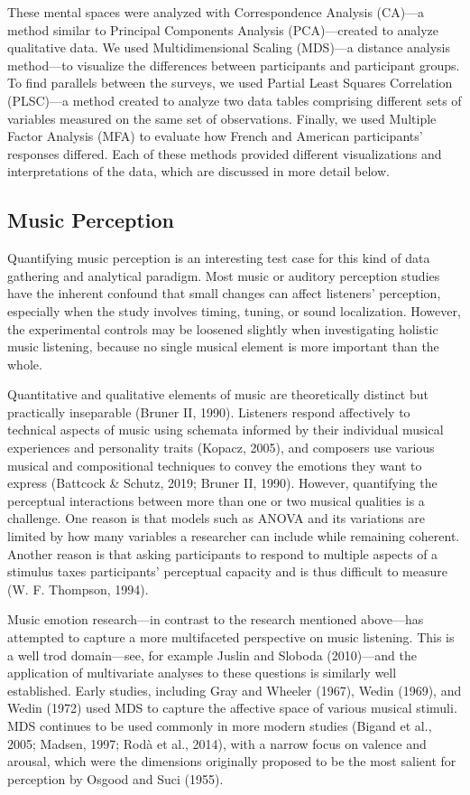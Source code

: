\documentclass[
  english,
  man]{apa6}
\begin{document}
These mental spaces were analyzed with Correspondence Analysis (CA)---a method similar to Principal Components Analysis (PCA)---created to analyze qualitative data. We used Multidimensional Scaling (MDS)---a distance analysis method---to visualize the differences between participants and participant groups. To find parallels between the surveys, we used Partial Least Squares Correlation (PLSC)---a method created to analyze two data tables comprising different sets of variables measured on the same set of observations. Finally, we used Multiple Factor Analysis (MFA) to evaluate how French and American participants' responses differed. Each of these methods provided different visualizations and interpretations of the data, which are discussed in more detail below.

\hypertarget{music-perception}{%
\subsection{Music Perception}\label{music-perception}}

Quantifying music perception is an interesting test case for this kind of data gathering and analytical paradigm. Most music or auditory perception studies have the inherent confound that small changes can affect listeners' perception, especially when the study involves timing, tuning, or sound localization. However, the experimental controls may be loosened slightly when investigating holistic music listening, because no single musical element is more important than the whole.

Quantitative and qualitative elements of music are theoretically distinct but practically inseparable (Bruner II, 1990). Listeners respond affectively to technical aspects of music using schemata informed by their individual musical experiences and personality traits (Kopacz, 2005), and composers use various musical and compositional techniques to convey the emotions they want to express (Battcock \& Schutz, 2019; Bruner II, 1990). However, quantifying the perceptual interactions between more than one or two musical qualities is a challenge. One reason is that models such as ANOVA and its variations are limited by how many variables a researcher can include while remaining coherent. Another reason is that asking participants to respond to multiple aspects of a stimulus taxes participants' perceptual capacity and is thus difficult to measure (W. F. Thompson, 1994).

Music emotion research---in contrast to the research mentioned above---has attempted to capture a more multifaceted perspective on music listening. This is a well trod domain---see, for example Juslin and Sloboda (2010)---and the application of multivariate analyses to these questions is similarly well established. Early studies, including Gray and Wheeler (1967), Wedin (1969), and Wedin (1972) used MDS to capture the affective space of various musical stimuli. MDS continues to be used commonly in more modern studies (Bigand et al., 2005; Madsen, 1997; Rodà et al., 2014), with a narrow focus on valence and arousal, which were the dimensions originally proposed to be the most salient for perception by Osgood and Suci (1955).
\end{document}
